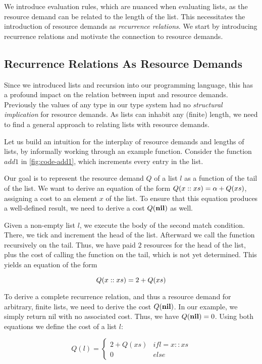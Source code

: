 We introduce evaluation rules, which are nuanced when evaluating lists, as the resource demand can be related to the length of the list. This necessitates the introduction of resource demands as \emph{recurrence relations}. We start by introducing recurrence relations and motivate the connection to resource demands. 

\subsection{Recurrence Relations As Resource Demands}\label{sec:recurrence-relation}

Since we introduced lists and recursion into our programming language, this has a profound impact on the relation between input and resource demands. Previously the values of any type in our type system had no \emph{structural implication} for resource demands. As lists can inhabit any (finite) length, we need to find a general approach to relating lists with resource demands. 

Let us build an intuition for the interplay of resource demands and lengths of lists, by informally working through an example function. Consider the function \(add1\) in \cref{fig:code-add1}, which increments every entry in the list.

Our goal is to represent the resource demand \(Q\) of a list \(l\) as a function of the tail of the list. We want to derive an equation of the form \(Q(x :: xs) = \alpha + Q(xs)\), assigning a cost to an element \(x\) of the list. To ensure that this equation produces a well-defined result, we need to derive a cost \(Q(\textbf{nil})\) as well.

Given a non-empty list \(l\), we execute the body of the second match condition. There, we tick and increment the head of the list. Afterward we call the function recursively on the tail. Thus, we have paid \(2\) resources for the head of the list, plus the cost of calling the function on the tail, which is not yet determined. This yields an equation of the form 

\[
   Q(x :: xs) = 2 + Q(xs)
\]


To derive a complete recurrence relation, and thus a resource demand for arbitrary, finite lists, we need to derive the cost \(Q(\textbf{nil})\). In our example, we simply return nil with no associated cost. Thus, we have \(Q(\textbf{nil}) = 0\). Using both equations we define the cost of a list \(l\):

\[
   Q(l) = \begin{cases*}
      2 + Q(xs)            & if l = x :: xs\\
      0                    & else
   \end{cases*}
\]

